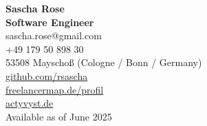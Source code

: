 \documentclass[a4paper,10pt]{article}
\begin{document}
\noindent
\begin{minipage}[c]{0.72\textwidth}
  {\LARGE\color{sectionblue}\textbf{Sascha Rose}}\\[0.5em]
  {\color{sectionblue}\textbf{Software Engineer}}\\[1.5em]
  \textcolor{sectionblue}{\faEnvelope}\hspace{0.5em}sascha.rose@gmail.com\\[0.25em]
  \textcolor{sectionblue}{\faPhone}\hspace{0.5em}+49 179 50 898 30\\[0.25em]
  \textcolor{sectionblue}{\faHome}\hspace{0.5em}53508 Mayschoß (Cologne / Bonn / Germany)\\[1em]
  \textcolor{sectionblue}{\faGithubSquare}\hspace{0.5em}\href{https://github.com/rsascha}{github.com/rsascha}\\[0.25em]
  \textcolor{sectionblue}{\faInfoCircle}\hspace{0.5em}\href{https://www.freelancermap.de/profil/senior-fullstack-developer-react-react-native-nodejs-javascript-typescript}{freelancermap.de/profil}\\[0.25em]
  \textcolor{sectionblue}{\faInfoCircle}\hspace{0.5em}\href{https://agentur.actyvyst.de/}{actyvyst.de}\\[1em]
  \textcolor{sectiongreen}{\faSeedling}\hspace{0.5em}Available as of June 2025\\
\end{minipage}
\hfill
\end{document}
